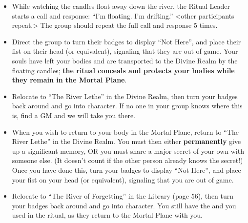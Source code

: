 \documentclass[green]{GL2020}
\begin{document}
\begin{enumerate}
\begin{itemize}
        \item While watching the candles float away down the river, the Ritual Leader starts a call and response: ``I'm floating. I'm drifting.'' <other participants repeat.> The group should repeat the full call and response 5 times.
        \item Direct the group to turn their badges to display ``Not Here'', and place their fist on their head (or equivalent), signaling that they are out of game. Your souls have left your bodies and are transported to the Divine Realm by the floating candles; \textbf{the ritual conceals and protects your bodies while they remain in the Mortal Plane}.
        \item Relocate to ``The River Lethe'' in the Divine Realm, then turn your badges back around and go into character. If no one in your group knows where this is, find a GM and we will take you there.
        \item When you wish to return to your body in the Mortal Plane, return to ``The River Lethe'' in the Divine Realm. You must then either \textbf{permanently} give up a significant memory, OR you must share a major secret of your own with someone else. (It doesn't count if the other person already knows the secret!) Once you have done this, turn your badges to display ``Not Here'', and place your fist on your head (or equivalent), signaling that you are out of game. 
       \item Relocate to ``The River of Forgetting'' in the Library (page 56), then turn your badges back around and go into character. You still have the \iRitualCandle{} and \iGlassVial{} you used in the ritual, as they return to the Mortal Plane with you.
    \end{itemize}
\end{enumerate}
\end{document}
